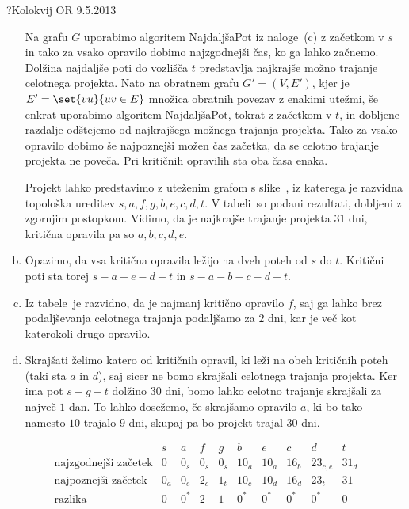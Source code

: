 \begin{naloga}{?}{Kolokvij OR 9.5.2013}
\begin{odgovor}
\begin{enumerate}[(a)]
Na grafu $G$ uporabimo algoritem {\sc NajdaljšaPot} iz naloge~\res[topo]{}(c)
z začetkom v $s$ in tako za vsako opravilo dobimo najzgodnejši čas,
ko ga lahko začnemo.
Dolžina najdaljše poti do vozlišča $t$
predstavlja najkrajše možno trajanje ce\-lot\-ne\-ga projekta.
Nato na obratnem grafu $G' = (V, E')$,
kjer je $E' = \set{vu}{uv \in E}$ množica obratnih povezav z enakimi utežmi,
še enkrat uporabimo algoritem {\sc NajdaljšaPot}, tokrat z začetkom v $t$,
in dobljene razdalje odštejemo od najkrajšega možnega trajanja projekta.
Tako za vsako opravilo dobimo še najpoznejši možen čas začetka,
da se celotno trajanje projekta ne poveča.
Pri kritičnih opravilih sta oba časa enaka.

Projekt lahko predstavimo z uteženim grafom s slike~\fig,
iz katerega je razvidna topološka ureditev $s, a, f, g, b, e, c, d, t$.
V tabeli~ so podani rezultati,
dobljeni z zgornjim postopkom.
Vidimo, da je najkrajše trajanje projekta $31$ dni,
kritična opravila pa so $a, b, c, d, e$.

\item Opazimo, da vsa kritična opravila ležijo na dveh poteh od $s$ do $t$.
Kritični poti sta torej $s - a - e - d - t$ in $s - a - b - c - d - t$.

\item Iz tabele~ je razvidno,
da je najmanj kritično opravilo $f$,
saj ga lahko brez podaljševanja celotnega trajanja podaljšamo za $2$ dni,
kar je več kot katerokoli drugo opravilo.

\item Skrajšati želimo katero od kritičnih opravil,
ki leži na obeh kritičnih poteh (taki sta $a$ in $d$),
saj sicer ne bomo skrajšali celotnega trajanja projekta.
Ker ima pot $s - g - t$ dolžino $30$ dni,
bomo lahko celotno trajanje skrajšali za največ $1$ dan.
To lahko dosežemo, če skrajšamo opravilo $a$,
ki bo tako namesto $10$ trajalo $9$ dni,
skupaj pa bo projekt trajal $30$ dni.
\end{enumerate}
%
\begin{slika}
\pgfslika
{}
\end{slika}
%
\begin{tabela}
$$
\begin{array}{r|ccccccccc}
& s & a & f & g & b & e & c & d & t \\ \hline
\text{najzgodnejši začetek} &
0 & 0_s & 0_s & 0_s & 10_a & 10_a & 16_b & 23_{c,e} & 31_d \\
\text{najpoznejši začetek} &
0_a & 0_e & 2_c & 1_t & 10_c & 10_d & 16_d & 23_t & 31 \\
\text{razlika} &
0 & 0^* & 2 & 1 & 0^* & 0^* & 0^* & 0^* & 0
\end{array}
$$
\end{tabela}
\end{odgovor}
\end{naloga}
